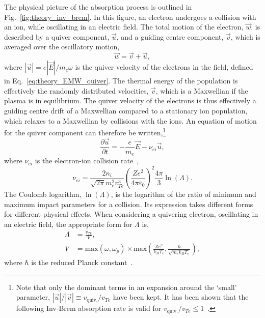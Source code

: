 The physical picture of the absorption process is outlined in Fig.~\ref{fig:theory_inv_brem}.
In this figure, an electron undergoes a collision with an ion, while oscillating in an electric field.
The total motion of the electron, $\vec{w}$, is described by a quiver component, $\vec{u}$, and a guiding centre component, $\vec{v}$, which is averaged over the oscillatory motion,
\begin{equation}
    \vec{w} = \vec{v} + \vec{u},
\end{equation}
where $|\vec{u}| = e|\vec{E}|/m_e \omega$ is the quiver velocity of the electrons in the field, defined in Eq.~\ref{eq:theory_EMW_quiver}.
The thermal energy of the population is effectively the randomly distributed velocities, $\vec{v}$, which is a Maxwellian if the plasma is in equilibrium.
The quiver velocity of the electrons is thus effectively a guiding centre drift of a Maxwellian compared to a stationary ion population, which relaxes to a Maxwellian by collisions with the ions.
An equation of motion for the quiver component can therefore be written,\footnote{Note that only the dominant terms in an expansion around the `small' parameter, $|\vec{u}|/|\vec{v}|\equiv v_\text{quiv.}/v_{Te}$ have been kept. It has been shown that the following \ac{Inv-Brem} absorption rate is valid for $v_\text{quiv.}/v_{Te}\leq 1$~\cite{bunkin_interaction_1973}.}
\begin{equation}
    \label{eq:theory_electron_quiver_partial}
    \frac{\partial\vec{u}}{\partial t} = - \frac{e}{m_e}\vec{E} - \nu_{ei} \vec{u},
\end{equation}
where $\nu_{ei}$ is the electron-ion collision rate~\cite{michel_introduction_2023},
\begin{equation}
    \nu_{ei} = \frac{2 n_i}{\sqrt{2\pi} m_e^2 v_{Te}^3} \left( \frac{Z e^2}{4 \pi \varepsilon_0} \right)^2 \frac{4\pi}{3} \ln{\left(\Lambda\right)}.
\end{equation}
The Coulomb logarithm, $\ln(\Lambda)$, is the logarithm of the ratio of minimum and maximum impact parameters for a collision.
Its expression takes different forms for different physical effects.
When considering a quivering electron, oscillating in an electric field, the appropriate form for $\Lambda$ is,
\begin{align}
    \Lambda &= \frac{v_{Te}}{V},\\
    V &= \text{max}\left( \omega, \omega_p \right) \times \text{max}\left( \frac{Z e^2}{k_B T_e}, \frac{\hbar}{\sqrt{m_e k_B T_e}} \right),
\end{align}
where $\hbar$ is the reduced Planck constant~\cite{huba_nrl_2013}.

